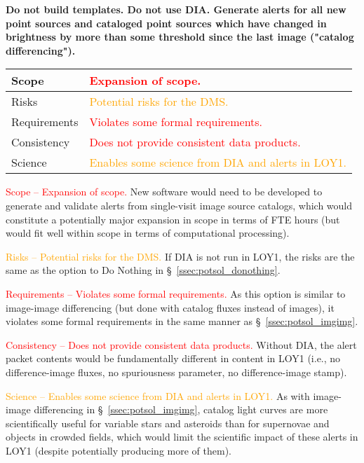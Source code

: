 \documentclass[DM,lsstdraft,toc]{lsstdoc}
\begin{document}
{\bf Do not build templates. Do not use DIA. Generate alerts for all new point sources and cataloged point sources which have changed in brightness by more than some threshold since the last image ("catalog differencing").}

\begin{center}
\begin{tabular}{|p{2.5cm}|p{13cm}|}
\hline
Scope & \textcolor{red}{Expansion of scope.}  \\
\hline
Risks & \textcolor{orange}{Potential risks for the DMS.} \\
\hline
Requirements & \textcolor{red}{Violates some formal requirements.} \\
\hline
Consistency & \textcolor{red}{Does not provide consistent data products.} \\
\hline
Science & \textcolor{orange}{Enables some science from DIA and alerts in LOY1.} \\
\hline
\end{tabular}
\end{center}

\textcolor{red}{Scope -- Expansion of scope.} New software would need to be developed to generate and validate alerts from single-visit image source catalogs, which would constitute a potentially major expansion in scope in terms of FTE hours (but would fit well within scope in terms of computational processing).

\textcolor{orange}{Risks -- Potential risks for the DMS.} If DIA is not run in LOY1, the risks are the same as the option to Do Nothing in \S~\ref{ssec:potsol_donothing}. 

\textcolor{red}{Requirements -- Violates some formal requirements.} As this option is similar to image-image differencing (but done with catalog fluxes instead of images), it violates some formal requirements in the same manner as \S~\ref{ssec:potsol_imgimg}. 

\textcolor{red}{Consistency -- Does not provide consistent data products.} Without DIA, the alert packet contents would be fundamentally different in content in LOY1 (i.e., no difference-image fluxes, no spuriousness parameter, no difference-image stamp).

\textcolor{orange}{Science -- Enables some science from DIA and alerts in LOY1.} As with image-image differencing in \S~\ref{ssec:potsol_imgimg}, catalog light curves are more scientifically useful for variable stars and asteroids than for supernovae and objects in crowded fields, which would limit the scientific impact of these alerts in LOY1 (despite potentially producing more of them).
\end{document}
